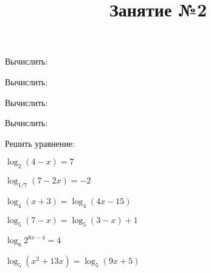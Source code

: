\newpage
\title{Занятие №2}
\begin{listofex}
	\item Вычислить:
	\begin{enumcols}[itemcolumns=3]
		\item {}
		\item {}
		\item {}
		\item {}
		\item {}
	\end{enumcols}
	\item Вычислить:
	\begin{enumcols}[itemcolumns=2]
		\item {}
		\item {}
		\item {}
		\item {}
		\item {}
	\end{enumcols}
	\item Вычислить:
	\begin{enumcols}[itemcolumns=2]
		\item {}
		\item {}
	\end{enumcols}
	\item Вычислить:
	\begin{enumcols}[itemcolumns=3]
		\item {}
		\item {}
		\item {}
	\end{enumcols}
	\item Решить уравнение:
	\begin{enumcols}[itemcolumns=2]
		\item \( \log_2(4-x)=7 \) 
		\item \( \log_{1/7}(7-2x)=-2 \) 
		\item \( \log_4(x+3)=\log_4(4x-15) \) 
		\item \( \log_5(7-x)=\log_5(3-x)+1 \) 
		\item \( \log_8 2^{8x-4}=4 \) 
		\item \( \log_5(x^2+13x)=\log_5(9x+5) \) 
	\end{enumcols}
\end{listofex}
